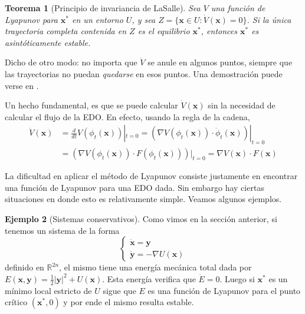 \documentclass[12pt, a4paper]{amsbook}
\newcommand{\R}{{\mathbb R}}
\newcommand{\xx}{{\mathbf x}}
\newcommand{\yy}{{\mathbf y}}
\newtheorem{teo}{Teorema}[section]
\theoremstyle{remark}
\theoremstyle{definition}
\newtheorem{ejem}[teo]{Ejemplo}
\numberwithin{section}{chapter}
\numberwithin{subsection}{section}
\numberwithin{equation}{section}
\numberwithin{figure}{chapter}
\begin{document}
\begin{teo}[Principio de invariancia de LaSalle]\label{teo:lasalle}
Sea $V$ una función de Lyapunov para $\xx^*$ en un entorno $U$, y sea $Z = \{\xx\in U\colon \dot V(\xx) = 0\}$. Si la única trayectoria completa contenida en $Z$ es el equilibrio $\xx^*$, entonces $\xx^*$ es asintóticamente estable.
\end{teo}

Dicho de otro modo: no importa que $\dot V$ se anule en algunos puntos, siempre que las trayectorias no puedan \emph{quedarse} en esos puntos. Una demostración puede verse en \cite{Hirsch-Smale-Devaney}.

Un hecho fundamental, es que se puede calcular $\dot V(\xx)$ sin la necesidad de calcular el flujo de la EDO. En efecto, usando la regla de la cadena,
\begin{align*}
\dot V(\xx) &= \frac{d}{dt}V(\phi_t(\xx))|_{t=0} = (\nabla V(\phi_t(\xx))\cdot \dot\phi_t(\xx))|_{t=0}\\
& = (\nabla V(\phi_t(\xx))\cdot F(\phi_t(\xx)))|_{t=0} = \nabla V(\xx)\cdot F(\xx)
\end{align*}

La dificultad en aplicar el método de Lyapunov consiste justamente en encontrar una función de Lyapunov para una EDO dada. Sin embargo hay ciertas situaciones en donde esto es relativamente simple. Veamos algunos ejemplos.

\begin{ejem}[Sistemas conservativos]\label{ej:sistema_conservativo}
Como vimos en la sección anterior, si tenemos un sistema de la forma
$$
\begin{cases}
\dot \xx = \yy\\
\dot \yy = -\nabla U(\xx)
\end{cases}
$$
definido en $\R^{2n}$, el mismo tiene una energía mecánica total dada por $E(\xx, \yy) = \frac12 |\yy|^2 + U(\xx)$. Esta energía verifica que $\dot E=0$. Luego si $\xx^*$ es un mínimo local estricto de $U$ sigue que $E$ es una función de Lyapunov para el punto crítico $(\xx^*, 0)$ y por ende el mismo resulta estable.
\end{ejem}
\end{document}
